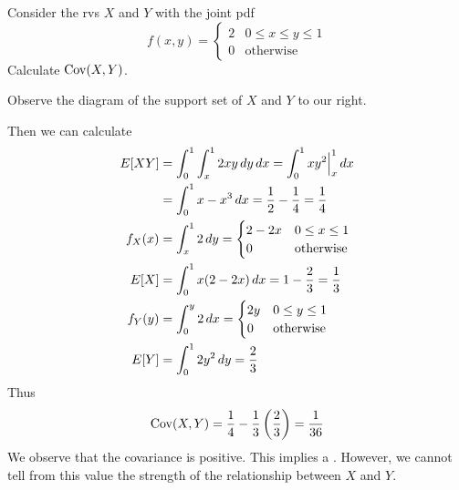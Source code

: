 \documentclass[notoc,notitlepage]{tufte-book}
\begin{document}
\begin{eg}[Example 3.17]
  Consider the rvs $X$ and $Y$ with the joint pdf
  \begin{equation*}
    f(x, y) = \begin{cases}
      2 & 0 \leq x \leq y \leq 1 \\
      0 & \text{otherwise}
    \end{cases}
  \end{equation*}
  Calculate $\operatorname{Cov}(X, Y)$.

  \begin{solution}
  Observe the diagram of the support set of $X$ and $Y$ to our right.

  Then we can calculate
  \begin{align*}
    E[ XY ]  & = \int_{0}^{1} \int_{x}^{1} 2xy \dif{y} \dif{x} = \int_{0}^{1} xy^2 \at{x}{1} \dif{x} \\
             & = \int_{0}^{1} x - x^3 \dif{x} = \frac{1}{2} - \frac{1}{4} = \frac{1}{4} \\
    f_X(x)   & = \int_{x}^{1} 2 \dif{y} = \begin{cases}
                  2 - 2x & 0 \leq x \leq 1 \\
                  0      & \text{otherwise}
                \end{cases} \\
    E[X]     & = \int_{0}^{1} x (2 - 2x) \dif{x} = 1 - \frac{2}{3} = \frac{1}{3}\\
    f_Y(y)   & = \int_{0}^{y} 2 \dif{x} = \begin{cases}
                  2y & 0 \leq y \leq 1 \\
                  0  & \text{otherwise}
                \end{cases} \\
    E[Y]     & = \int_{0}^{1} 2y^2 \dif{y} = \frac{2}{3}
  \end{align*}
  Thus
  \begin{equation*}
    \operatorname{Cov}(X, Y) = \frac{1}{4} - \frac{1}{3} \left( \frac{2}{3} \right) = \frac{1}{36}
  \end{equation*}
  We observe that the covariance is positive. This implies a . However, we cannot tell from this value the strength of the relationship between $X$ and $Y$.
  \end{solution}
\end{eg}
\end{document}
